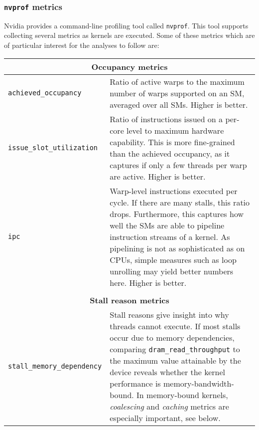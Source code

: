\subsubsection{\texttt{nvprof} metrics} \label{sec:metrics}

Nvidia provides a command-line profiling tool called \texttt{nvprof}. This tool supports collecting several metrics as kernels are executed. Some of these metrics which are of particular interest for the analyses to follow are:

\begin{center}
\begin{longtable}{p{} p{}}
    \multicolumn{2}{c}{\textbf{Occupancy metrics}} \\
    \hline
    \hline
    
    \raggedright \texttt{achieved\_\allowbreak occupancy} & Ratio of active warps to the maximum number of warps supported on an SM, averaged over all SMs. Higher is better. \\
    \hline
    \raggedright \texttt{issue\_\allowbreak slot\_\allowbreak utilization} & Ratio of instructions issued on a per-core level to maximum hardware capability. This is more fine-grained than the achieved occupancy, as it captures if only a few threads per warp are active. Higher is better. \\
    \hline
    \raggedright \texttt{ipc} & Warp-level instructions executed per cycle. If there are many stalls, this ratio drops. Furthermore, this captures how well the SMs are able to pipeline instruction streams of a kernel. As pipelining is not as sophisticated as on CPUs, simple measures such as loop unrolling may yield better numbers here. Higher is better. \\
    
    \\
    \multicolumn{2}{c}{\textbf{Stall reason metrics}} \\
    \hline
    \hline
    \raggedright \texttt{stall\_\allowbreak memory\_\allowbreak dependency} & Stall reasons give insight into why threads cannot execute. If most stalls occur due to memory dependencies, comparing \texttt{dram\_read\_throughput} to the maximum value attainable by the device reveals whether the kernel performance is memory-bandwidth-bound. In memory-bound kernels, \textit{coalescing} and \textit{caching} metrics are especially important, see below. \\
    

\end{longtable}
\end{center}
